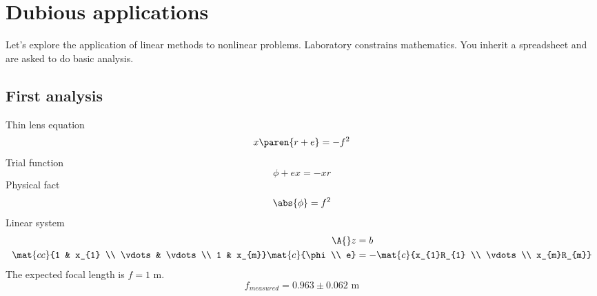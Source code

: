 \section{\label{sec:dubious}Dubious applications}
Let's explore the application of linear methods to nonlinear problems.
Laboratory constrains mathematics. You inherit a spreadsheet and are asked to do basic analysis.

\subsection{First analysis}
Thin lens equation
  \begin{equation}
      x\paren{r+e} = -f^{2}
  \end{equation}
Trial function
  \begin{equation}
      \phi + e x = -x r
  \end{equation}
Physical fact
  \begin{equation}
      \abs{\phi} = f^{2}
  \end{equation}
Linear system
  \begin{equation}
    \begin{split}
      \A{} z &= b\\
      \mat{cc}{1 & x_{1} \\ \vdots & \vdots \\ 1 & x_{m}}
      \mat{c}{\phi \\ e} &= 
     -\mat{c}{x_{1}R_{1} \\ \vdots \\ x_{m}R_{m}}
    \end{split}
  \end{equation}
The expected focal length is $f=1$ m.
  \begin{equation}
      f_{measured} = 0.963 \pm 0.062 \text{ m}
  \end{equation}

